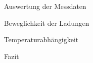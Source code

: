 \documentclass[pdftex, a4paper,11pt, twoside, ngerman]{report}
\begin{document}
\begin{chapter}{Auswertung der Messdaten}
\begin{section}{Beweglichkeit der Ladungen}
    \end{section}
   
   
   
    \begin{section}{Temperaturabhängigkeit}
      \label{chp:AuswertungTemperaturen}
      
      
      
    \end{section}
    
    
    
    \begin{section}{Fazit}
      \label{chp:Fazit}
      
      
      
    \end{section}
    
  \end{chapter}
  
  
  
  
  
  
  
  \begin{thebibliography}{99}
    \scriptsize
    
  \end{thebibliography}
 
\end{document}
